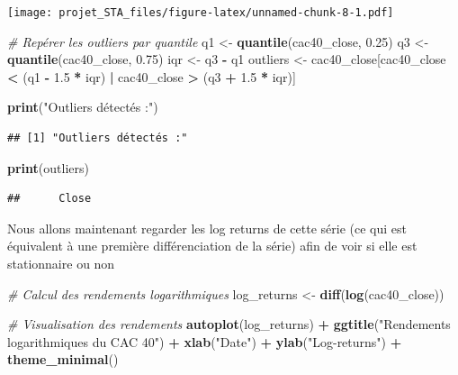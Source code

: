 \documentclass[
]{article}
\newenvironment{Shaded}{\begin{snugshade}}{\end{snugshade}}
\newcommand{\CommentTok}[1]{\textcolor[rgb]{0.56,0.35,0.01}{\textit{#1}}}
\newcommand{\FloatTok}[1]{\textcolor[rgb]{0.00,0.00,0.81}{#1}}
\newcommand{\FunctionTok}[1]{\textcolor[rgb]{0.13,0.29,0.53}{\textbf{#1}}}
\newcommand{\NormalTok}[1]{#1}
\newcommand{\OtherTok}[1]{\textcolor[rgb]{0.56,0.35,0.01}{#1}}
\newcommand{\SpecialCharTok}[1]{\textcolor[rgb]{0.81,0.36,0.00}{\textbf{#1}}}
\newcommand{\StringTok}[1]{\textcolor[rgb]{0.31,0.60,0.02}{#1}}
\begin{document}
\texttt{[image: projet\_STA\_files/figure-latex/unnamed-chunk-8-1.pdf]}

\begin{Shaded}
\begin{Highlighting}[]
\CommentTok{\# Repérer les outliers par quantile}
\NormalTok{q1 }\OtherTok{\textless{}{-}} \FunctionTok{quantile}\NormalTok{(cac40\_close, }\FloatTok{0.25}\NormalTok{)}
\NormalTok{q3 }\OtherTok{\textless{}{-}} \FunctionTok{quantile}\NormalTok{(cac40\_close, }\FloatTok{0.75}\NormalTok{)}
\NormalTok{iqr }\OtherTok{\textless{}{-}}\NormalTok{ q3 }\SpecialCharTok{{-}}\NormalTok{ q1}
\NormalTok{outliers }\OtherTok{\textless{}{-}}\NormalTok{ cac40\_close[cac40\_close }\SpecialCharTok{\textless{}}\NormalTok{ (q1 }\SpecialCharTok{{-}} \FloatTok{1.5} \SpecialCharTok{*}\NormalTok{ iqr) }\SpecialCharTok{|}\NormalTok{ cac40\_close }\SpecialCharTok{\textgreater{}}\NormalTok{ (q3 }\SpecialCharTok{+} \FloatTok{1.5} \SpecialCharTok{*}\NormalTok{ iqr)]}

\FunctionTok{print}\NormalTok{(}\StringTok{"Outliers détectés :"}\NormalTok{)}
\end{Highlighting}
\end{Shaded}

\begin{verbatim}
## [1] "Outliers détectés :"
\end{verbatim}

\begin{Shaded}
\begin{Highlighting}[]
\FunctionTok{print}\NormalTok{(outliers)}
\end{Highlighting}
\end{Shaded}

\begin{verbatim}
##      Close
\end{verbatim}

Nous allons maintenant regarder les log returns de cette série (ce qui
est équivalent à une première différenciation de la série) afin de voir
si elle est stationnaire ou non

\begin{Shaded}
\begin{Highlighting}[]
\CommentTok{\# Calcul des rendements logarithmiques}
\NormalTok{log\_returns }\OtherTok{\textless{}{-}} \FunctionTok{diff}\NormalTok{(}\FunctionTok{log}\NormalTok{(cac40\_close))}

\CommentTok{\# Visualisation des rendements}
\FunctionTok{autoplot}\NormalTok{(log\_returns) }\SpecialCharTok{+}
  \FunctionTok{ggtitle}\NormalTok{(}\StringTok{"Rendements logarithmiques du CAC 40"}\NormalTok{) }\SpecialCharTok{+}
  \FunctionTok{xlab}\NormalTok{(}\StringTok{"Date"}\NormalTok{) }\SpecialCharTok{+}
  \FunctionTok{ylab}\NormalTok{(}\StringTok{"Log{-}returns"}\NormalTok{) }\SpecialCharTok{+}
  \FunctionTok{theme\_minimal}\NormalTok{()}
\end{Highlighting}
\end{Shaded}
\end{document}
